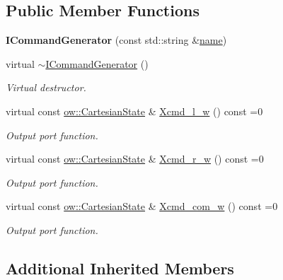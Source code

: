 \subsection*{Public Member Functions}
\begin{DoxyCompactItemize}
\item 
{\bfseries I\+Command\+Generator} (const std\+::string \&\hyperlink{classow_1_1GenericModuleBase_a4b712883728cdbab7779e27f9a23689c}{name})\hypertarget{classow_1_1ICommandGenerator_a2d1c06ce50f393fc2f2412341828da6e}{}\label{classow_1_1ICommandGenerator_a2d1c06ce50f393fc2f2412341828da6e}

\item 
virtual \hyperlink{classow_1_1ICommandGenerator_a3fa95de2b030993df8204013ec7bc039}{$\sim$\+I\+Command\+Generator} ()\hypertarget{classow_1_1ICommandGenerator_a3fa95de2b030993df8204013ec7bc039}{}\label{classow_1_1ICommandGenerator_a3fa95de2b030993df8204013ec7bc039}

\begin{DoxyCompactList}\small\item\em Virtual destructor. \end{DoxyCompactList}\item 
virtual const \hyperlink{classow__core_1_1CartesianState}{ow\+::\+Cartesian\+State} \& \hyperlink{classow_1_1ICommandGenerator_a964c3ff445e3de3aa19fb617b221b5b8}{Xcmd\+\_\+l\+\_\+w} () const =0
\begin{DoxyCompactList}\small\item\em Output port function. \end{DoxyCompactList}\item 
virtual const \hyperlink{classow__core_1_1CartesianState}{ow\+::\+Cartesian\+State} \& \hyperlink{classow_1_1ICommandGenerator_ae7309a2b5839ee3376380693617a0cdd}{Xcmd\+\_\+r\+\_\+w} () const =0
\begin{DoxyCompactList}\small\item\em Output port function. \end{DoxyCompactList}\item 
virtual const \hyperlink{classow__core_1_1CartesianState}{ow\+::\+Cartesian\+State} \& \hyperlink{classow_1_1ICommandGenerator_a3b635bf72503ad1e11d5edc8514a6ec0}{Xcmd\+\_\+com\+\_\+w} () const =0
\begin{DoxyCompactList}\small\item\em Output port function. \end{DoxyCompactList}\end{DoxyCompactItemize}
\subsection*{Additional Inherited Members}


